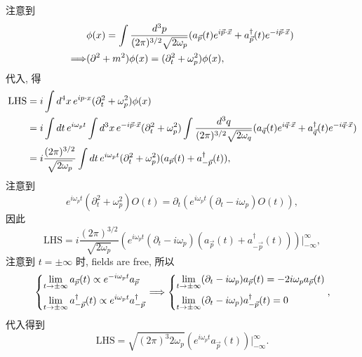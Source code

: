 \begin{itemize}
	\begin{tcolorbox}[title=proof:]
		注意到
		\begin{align}
			& \phi(x) = \int \frac{d^3 p}{(2 \pi)^{3 / 2} \sqrt{2 \omega_p}} (a_{\vec{p}}(t) e^{i \vec{p} \cdot \vec{x}} + a^\dag_{\vec{p}}(t) e^{- i \vec{p} \cdot \vec{x}}) \notag \\
			\Longrightarrow & (\partial^2 + m^2) \phi(x) = (\partial_t^2 + \omega_p^2) \phi(x),
		\end{align}
		代入, 得
		\begin{align}
			\text{LHS} &= i \int d^4 x \, e^{i p \cdot x} (\partial_t^2 + \omega_p^2) \phi(x) \notag \\
			&= i \int dt \, e^{i \omega_p t} \int d^3 x \, e^{- i \vec{p} \cdot \vec{x}} (\partial_t^2 + \omega_p^2) \int \frac{d^3 q}{(2 \pi)^{3 / 2} \sqrt{2 \omega_q}} (a_{\vec{q}}(t) e^{i \vec{q} \cdot \vec{x}} + a^\dag_{\vec{q}}(t) e^{- i \vec{q} \cdot \vec{x}}) \notag \\
			&= i \frac{(2 \pi)^{3 / 2}}{\sqrt{2 \omega_p}} \int dt \, e^{i \omega_p t} (\partial_t^2 + \omega_p^2) (a_{\vec{p}}(t) + a^\dag_{- \vec{p}}(t)),
		\end{align}
		注意到
		\begin{equation}
			e^{i \omega_p t} (\partial_t^2 + \omega_p^2) O(t) = \partial_t(e^{i \omega_p t} (\partial_t - i \omega_p) O(t)),
		\end{equation}
		因此
		\begin{equation}
			\text{LHS} = i \frac{(2 \pi)^{3 / 2}}{\sqrt{2 \omega_p}} (e^{i \omega_p t} (\partial_t - i \omega_p) (a_{\vec{p}}(t) + a^\dag_{- \vec{p}}(t))) \Big|^\infty_{- \infty},
		\end{equation}
		注意到 $t = \pm \infty$ 时, fields are free, 所以
		\begin{equation} \label{the S-matrix and time-ordered products.1.9}
			\begin{dcases}
				\lim_{t \rightarrow \pm \infty} a_{\vec{p}}(t) \propto e^{- i \omega_p t} a_{\vec{p}} \\
				\lim_{t \rightarrow \pm \infty} a^\dag_{- \vec{p}}(t) \propto e^{i \omega_p t} a^\dag_{- \vec{p}}
			\end{dcases} \Longrightarrow \begin{dcases}
				\lim_{t \rightarrow \pm \infty} (\partial_t - i \omega_p) a_{\vec{p}}(t) = - 2 i \omega_p a_{\vec{p}}(t) \\
				\lim_{t \rightarrow \pm \infty} (\partial_t - i \omega_p) a^\dag_{- \vec{p}}(t) = 0
			\end{dcases},
		\end{equation}
		代入得到
		\begin{equation}
			\text{LHS} = \sqrt{(2 \pi)^3 2 \omega_p} (e^{i \omega_p t} a_{\vec{p}}(t)) \Big|^\infty_{- \infty}.
		\end{equation}
	\end{tcolorbox}
	

\end{itemize}
